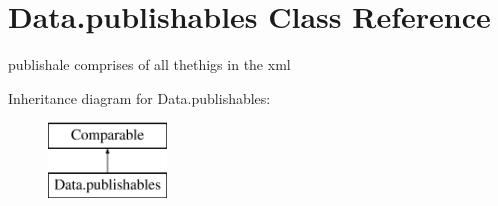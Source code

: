 \hypertarget{class_data_1_1publishables}{}\section{Data.\+publishables Class Reference}
\label{class_data_1_1publishables}


publishale comprises of all thethigs in the xml  


Inheritance diagram for Data.\+publishables\+:\begin{figure}[H]
\begin{center}
\leavevmode
\includegraphics[height=2.000000cm]{class_data_1_1publishables}
\end{center}
\end{figure}
